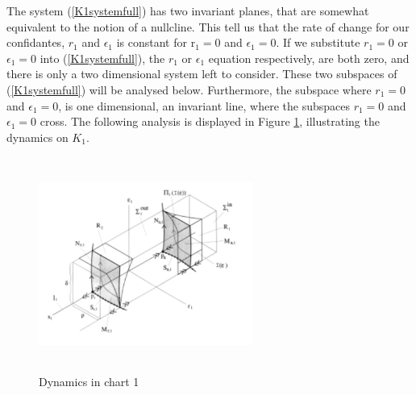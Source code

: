 The system (\ref{K1systemfull}) has two invariant planes, that are somewhat equivalent to the notion of a nullcline. This tell us that the rate of change for our confidantes, $ r_1 $ and $ \epsilon_1 $ is constant for r$ _1=0 $ and $\epsilon_1=0$. If we substitute $r_1=0$ or $\epsilon_1=0$ into (\ref{K1systemfull}), the $r_1$ or $\epsilon_1$ equation respectively, are both zero, and there is only a two dimensional system left to consider. These two subspaces of (\ref{K1systemfull}) will be analysed below. Furthermore, the subspace where $r_1=0$ and $\epsilon_1=0$, is one dimensional, an invariant line, where the subspaces $r_1=0$ and $\epsilon_1=0$ cross.
The following analysis is displayed in Figure \ref{fig:k1chart}, illustrating the dynamics on $K_1$.
\begin{figure}[h!]
	\centering
	\includegraphics[height=7cm,width=7cm]{Images/K1Chart}
	\caption{Dynamics in chart 1 \citep{krupa2001}}
		\label{fig:k1chart}
\end{figure}



